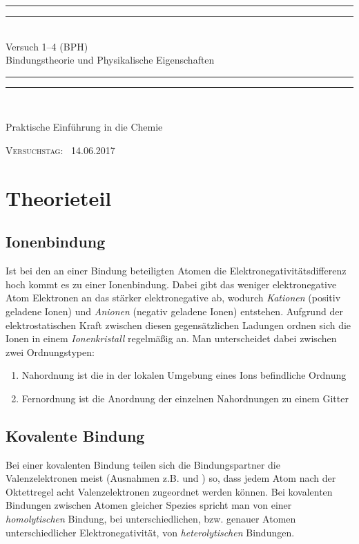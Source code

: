 \documentclass{scrartcl}
\newlength{\drop}
\begin{document}
  \begin{titlepage}
    \textheight
    \centering
    \vspace*{\baselineskip}
    \rule{\textwidth}{1.6pt}\vspace*{-\baselineskip}\vspace*{2pt}
    \rule{\textwidth}{0.4pt}\\[\baselineskip]
    {\LARGE Versuch 1--4 (BPH)\\[0.3\baselineskip] Bindungstheorie und Physikalische Eigenschaften}\\[0.2\baselineskip]
    \rule{\textwidth}{0.4pt}\vspace*{-\baselineskip}\vspace{3.2pt}
    \rule{\textwidth}{1.6pt}\\[\baselineskip]
    \scshape
    {Praktische Einführung in die Chemie\par}
    \vspace*{2\baselineskip}
    \vfill
    {\scshape Versuchstag:} \        {\large 14.06.2017}\par
  \end{titlepage}
\section{Theorieteil}
\subsection{Ionenbindung}
Ist bei den an einer Bindung beteiligten Atomen die Elektronegativitätsdifferenz hoch kommt es zu einer Ionenbindung. Dabei gibt das weniger elektronegative Atom Elektronen an das stärker elektronegative ab, wodurch \emph{Kationen} (positiv geladene Ionen) und \emph{Anionen} (negativ geladene Ionen) entstehen. Aufgrund der elektrostatischen Kraft zwischen diesen gegensätzlichen Ladungen ordnen sich die Ionen in einem \emph{Ionenkristall} regelmäßig an. Man unterscheidet dabei zwischen zwei Ordnungstypen:
\begin{enumerate}
	\item Nahordnung ist die in der lokalen Umgebung eines Ions befindliche Ordnung
	\item Fernordnung ist die Anordnung der einzelnen Nahordnungen zu einem Gitter
\end{enumerate}
\subsection{Kovalente Bindung}
Bei einer kovalenten Bindung teilen sich die Bindungspartner die Valenzelektronen meist (Ausnahmen z.B.  und ) so, dass jedem Atom nach der Oktettregel acht Valenzelektronen zugeordnet werden können. Bei kovalenten Bindungen zwischen Atomen gleicher Spezies spricht man von einer \emph{homolytischen} Bindung, bei unterschiedlichen, bzw. genauer Atomen unterschiedlicher Elektronegativität, von \emph{heterolytischen} Bindungen.  
\end{document}
